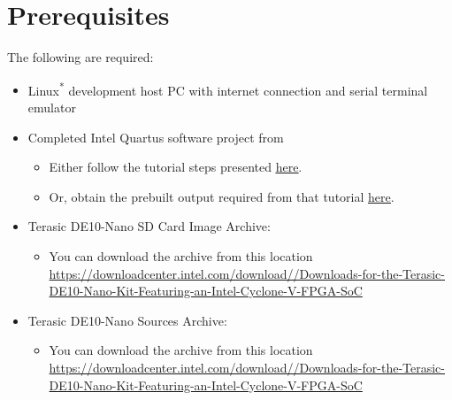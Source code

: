 \section*{Prerequisites}

\begin{flushleft}
\noindent
The following are required:

\begin{itemize}

\item Linux\textsuperscript{*} development host PC with internet connection and serial terminal emulator
\item Completed Intel\textsuperscript{\textregistered} Quartus\textsuperscript{\textregistered} software project from 
\begin{itemize}
\item Either follow the tutorial steps presented \href{\TheReleasesURL/writeup_MyFirstHPSSystem.pdf}{\underline{here}}.
\item Or, obtain the prebuilt output required from that tutorial \hyperlink{blinkArchive}{\underline{here}}.
\end{itemize}
\item Terasic DE10-Nano SD Card Image Archive: \small \MySDIMAGETGZ \normalsize
\begin{itemize}
\item You can download the archive from this location \href{https://downloadcenter.intel.com/download/26687/Downloads-for-the-Terasic-DE10-Nano-Kit-Featuring-an-Intel-Cyclone-V-FPGA-SoC}{https://\allowbreak downloadcenter.\allowbreak intel.\allowbreak com/\allowbreak download//\allowbreak Downloads-\allowbreak for-\allowbreak the-\allowbreak Terasic-\allowbreak DE10-\allowbreak Nano-\allowbreak Kit-\allowbreak Featuring-\allowbreak an-\allowbreak Intel-\allowbreak Cyclone-\allowbreak V-\allowbreak FPGA-\allowbreak SoC}
\end{itemize}
\item Terasic DE10-Nano Sources Archive: \small \MySDSRCTGZ \normalsize
\begin{itemize}
\item You can download the archive from this location \href{https://downloadcenter.intel.com/download/26687/Downloads-for-the-Terasic-DE10-Nano-Kit-Featuring-an-Intel-Cyclone-V-FPGA-SoC}{https://\allowbreak downloadcenter.\allowbreak intel.\allowbreak com/\allowbreak download//\allowbreak Downloads-\allowbreak for-\allowbreak the-\allowbreak Terasic-\allowbreak DE10-\allowbreak Nano-\allowbreak Kit-\allowbreak Featuring-\allowbreak an-\allowbreak Intel-\allowbreak Cyclone-\allowbreak V-\allowbreak FPGA-\allowbreak SoC}

\end{itemize}
\end{itemize}
\end{flushleft}
